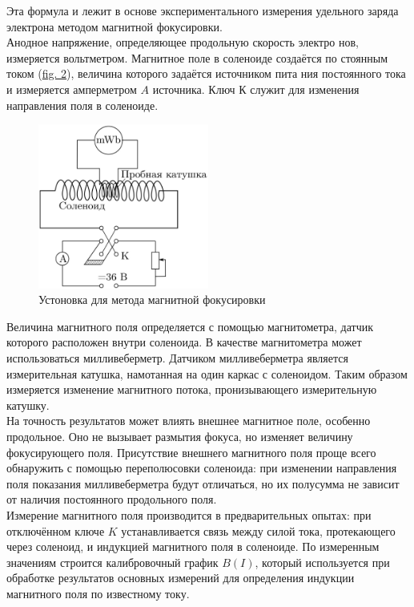 \documentclass[a4paper]{article}
\begin{document}
Эта формула и лежит в основе экспериментального измерения удельного заряда электрона методом магнитной фокусировки.\\
Анодное напряжение, определяющее продольную скорость электро
нов, измеряется вольтметром. Магнитное поле в соленоиде создаётся по
стоянным током (\hyperref[MethMagnInduction]{fig. 2}), величина которого задаётся источником пита
ния постоянного тока и измеряется амперметром $A$ источника. Ключ К
служит для изменения направления поля в соленоиде.

\begin{figure}[h]
\begin{center}
	\includegraphics[width = 0.5\textwidth]{УстМагнФокусировки}
	\caption{Устоновка для метода магнитной фокусировки}
\label{MethMagnInduction}
\end{center}
\end{figure}

Величина магнитного поля определяется с помощью магнитометра, датчик которого расположен внутри соленоида. В качестве магнито­метра может использоваться милливеберметр. Датчиком милливеберметра является измерительная катушка, намотанная на один каркас с соленоидом. Таким образом измеряется изменение магнитного потока, пронизывающего измерительную катушку.\\
На точность результатов может влиять внешнее магнитное поле, осо­бенно продольное. Оно не вызывает размытия фокуса, но изменяет ве­личину фокусирующего поля. Присутствие внешнего магнитного поля проще всего обнаружить с помощью переполюсовки соленоида: при изме­нении направления поля показания милливеберметра будут отличаться, но их полусумма не зависит от наличия постоянного продольного поля.\\
Измерение магнитного поля производится в предварительных опы­тах: при отключённом ключе $K$ устанавливается связь между силой то­ка, протекающего через соленоид, и индукцией магнитного поля в соле­ноиде. По измеренным значениям строится калибровочный график $B(I)$, который используется при обработке результатов основных измерений
для определения индукции магнитного поля по известному току.
\end{document}
